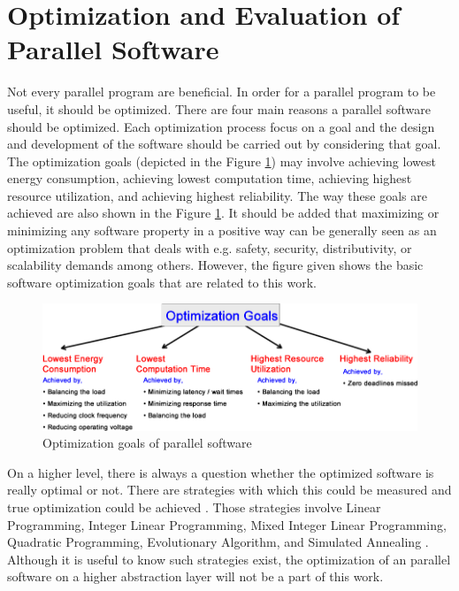 \section{Optimization and Evaluation of Parallel Software} \label{opt}
Not every parallel program are beneficial. In order for a parallel program to be useful, it should be optimized. There are four main reasons a parallel software should be optimized. Each optimization process focus on a goal and the design and development of the software should be carried out by considering that goal. The optimization goals (depicted in the Figure \ref{fig:optimization2})  may involve achieving lowest energy consumption, achieving lowest computation time, achieving highest resource utilization, and achieving highest reliability. The way these goals are achieved are also shown in the Figure \ref{fig:optimization2}. It should be added that maximizing or minimizing any software property in a positive way can be generally seen as an optimization problem that deals with e.g. safety, security, distributivity, or scalability demands among others. However, the figure given shows the basic software optimization goals that are related to this work.

\begin{figure}[!ht]
	\centering
	\captionsetup{justification=centering}
	\includegraphics[width=\textwidth]{content/images/optimization2.png}
	\caption{Optimization goals of parallel software \cite{lukas1}}
	\label{fig:optimization2}
\end{figure}

On a higher level, there is always a question whether the optimized software is really optimal or not. There are strategies with which this could be measured and true optimization could be achieved \cite{lukas1}. Those strategies involve Linear Programming, Integer Linear Programming, Mixed Integer Linear Programming, Quadratic Programming, Evolutionary Algorithm, and Simulated Annealing \cite{lukas1}. Although it is useful to know such strategies exist, the optimization of an parallel software on a higher abstraction layer will not be a part of this work. 


